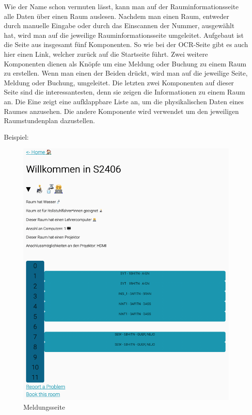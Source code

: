 Wie der Name schon vermuten lässt, kann man auf der Rauminformationsseite alle Daten über einen Raum auslesen. Nachdem man einen Raum, entweder durch manuelle Eingabe oder durch das Einscannen der Nummer, ausgewählt hat, wird man auf die jeweilige Rauminformationsseite umgeleitet. Aufgebaut ist die Seite aus insgesamt fünf Komponenten. So wie bei der OCR-Seite gibt es auch hier einen Link, welcher zurück auf die Startseite führt. Zwei weitere Komponenten dienen als Knöpfe um eine Meldung oder Buchung zu einem Raum zu erstellen. Wenn man einen der Beiden drückt, wird man auf die jeweilige Seite, Meldung oder Buchung, umgeleitet. Die letzten zwei Komponenten auf dieser Seite sind die interessantesten, denn sie zeigen die Informationen zu einem Raum an. Die Eine zeigt eine aufklappbare Liste an, um die physikalischen Daten eines Raumes anzusehen. Die andere Komponente wird verwendet um den jeweiligen Raumstundenplan dazustellen.

Beispiel:

\begin{figure}[H]
    \centering
    \includegraphics[width=120mm]{media/WebComponents/Rauminformationsseite_light.png}
    \caption{Meldungsseite}
\end{figure}

